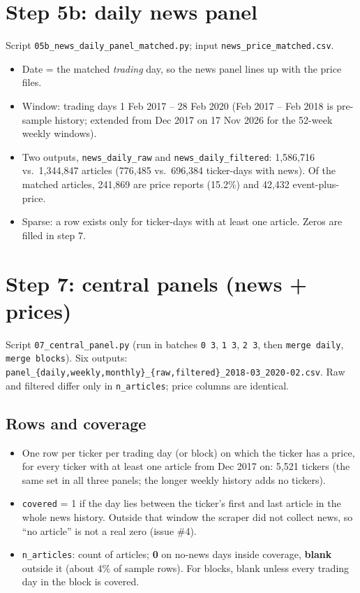 \documentclass[11pt]{article}
\newcommand{\var}[1]{\texttt{#1}}
\begin{document}
\section{Step 5b: daily news panel}\label{sec:5b}

Script \var{05b\_news\_daily\_panel\_matched.py}; input \var{news\_price\_matched.csv}.
\begin{itemize}
  \item Date = the matched \emph{trading} day, so the news panel lines up with the price files.
  \item Window: trading days 1 Feb 2017 -- 28 Feb 2020 (Feb 2017 -- Feb 2018 is pre-sample history; extended from Dec 2017 on 17 Nov 2026 for the 52-week weekly windows).
  \item Two outputs, \var{news\_daily\_raw} and \var{news\_daily\_filtered}: 1,586,716 vs.\ 1,344,847 articles (776,485 vs.\ 696,384 ticker-days with news). Of the matched articles, 241,869 are price reports (15.2\%) and 42,432 event-plus-price.
  \item Sparse: a row exists only for ticker-days with at least one article. Zeros are filled in step 7.
\end{itemize}

\section{Step 7: central panels (news + prices)}

Script \var{07\_central\_panel.py} (run in batches \var{0 3}, \var{1 3}, \var{2 3}, then \var{merge daily}, \var{merge blocks}). Six outputs: \var{panel\_\{daily,weekly,monthly\}\_\{raw,filtered\}\_2018-03\_2020-02.csv}. Raw and filtered differ only in \var{n\_articles}; price columns are identical.

\subsection{Rows and coverage}
\begin{itemize}
  \item One row per ticker per trading day (or block) on which the ticker has a price, for every ticker with at least one article from Dec 2017 on: 5,521 tickers (the same set in all three panels; the longer weekly history adds no tickers).
  \item \var{covered} = 1 if the day lies between the ticker's first and last article in the whole news history. Outside that window the scraper did not collect news, so ``no article'' is not a real zero (issue \#4).
  \item \var{n\_articles}: count of articles; \textbf{0} on no-news days inside coverage, \textbf{blank} outside it (about 4\% of sample rows). For blocks, blank unless every trading day in the block is covered.
\end{itemize}
\end{document}
